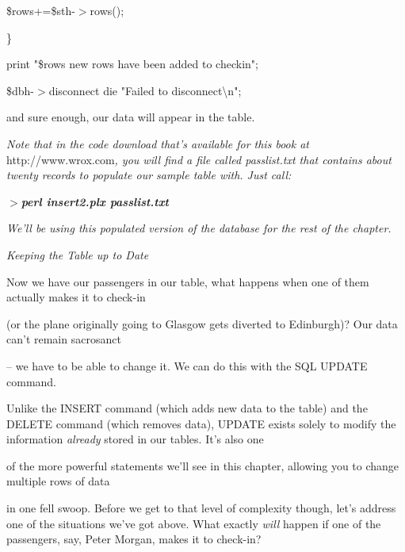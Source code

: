 \documentclass[a4paper,11pt]{book}
\begin{document}
\noindent 

\noindent \$rows+=\$sth-$>$rows();

\noindent \}

\noindent 

\noindent print "\$rows new rows have been added to checkin";

\noindent 

\noindent \$dbh-$>$disconnect \textbar \textbar  die "Failed to disconnect\textbackslash n";

\noindent 

\noindent and sure enough, our data will appear in the table.

\noindent 

\noindent \textit{Note that in the code download that's available for this book at }http://www.wrox.com\textit{, you will find a file called passlist.txt that contains about twenty records to populate our sample table with. Just call:}

\noindent 

\noindent \textit{$>$}\textbf{\textit{perl insert2.plx passlist.txt}}

\noindent 

\noindent \textit{We'll be using this populated version of the database for the rest of the chapter.}

\noindent 

\noindent 

\noindent \textit{Keeping the Table up to Date}

\noindent Now we have our passengers in our table, what happens when one of them actually makes it to check-in

\noindent (or the plane originally going to Glasgow gets diverted to Edinburgh)? Our data can't remain sacrosanct

\noindent -- we have to be able to change it. We can do this with the SQL UPDATE command.

\noindent 

\noindent Unlike the INSERT command (which adds new data to the table) and the DELETE command (which removes data), UPDATE exists solely to modify the information \textit{already }stored in our tables. It's also one

\noindent of the more powerful statements we'll see in this chapter, allowing you to change multiple rows of data

\noindent in one fell swoop. Before we get to that level of complexity though, let's address one of the situations we've got above. What exactly \textit{will }happen if one of the passengers, say, Peter Morgan, makes it to check-in?
\end{document}
